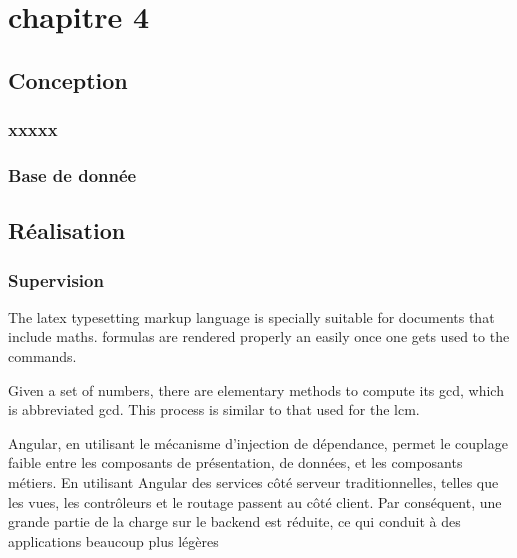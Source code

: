 \chapter{chapitre 4}
\begin{onehalfspace}



\section{Conception}



\subsection{xxxxx}

\subsection{Base de donnée}



\section{Réalisation}

\subsection{Supervision}



The \Gls{latex} typesetting markup language is specially suitable 
for documents that include \gls{maths}. \Glspl{formula} are 
rendered properly an easily once one gets used to the commands.
 
Given a set of numbers, there are elementary methods to compute 
its \acrlong{gcd}, which is abbreviated \acrshort{gcd}. This 
process is similar to that used for the \acrfull{lcm}.

Angular, en utilisant le mécanisme d'injection de dépendance, permet le couplage faible entre les composants de présentation, de données, et les composants métiers. En utilisant Angular des services côté serveur traditionnelles, telles que les vues, les contrôleurs et le routage passent au côté client. Par conséquent, une grande partie de la charge sur le backend est réduite, ce qui conduit à des applications beaucoup plus légères


\end{onehalfspace}
